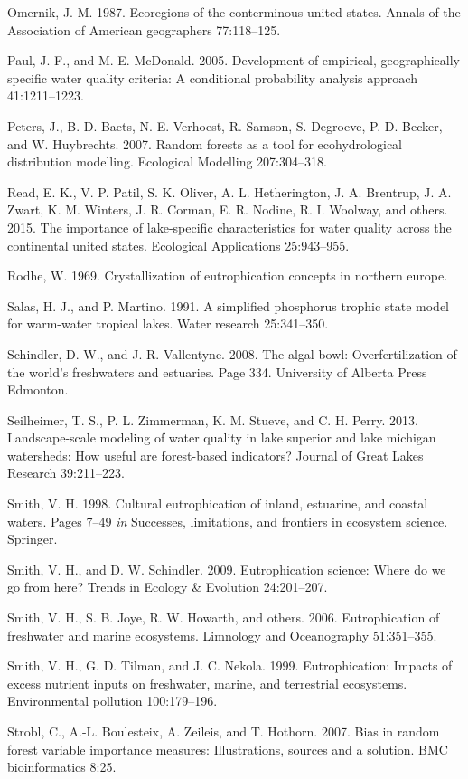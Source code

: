 \documentclass[12pt,]{article}
\begin{document}
Omernik, J. M. 1987. Ecoregions of the conterminous united states.
Annals of the Association of American geographers 77:118--125.

Paul, J. F., and M. E. McDonald. 2005. Development of empirical,
geographically specific water quality criteria: A conditional
probability analysis approach 41:1211--1223.

Peters, J., B. D. Baets, N. E. Verhoest, R. Samson, S. Degroeve, P. D.
Becker, and W. Huybrechts. 2007. Random forests as a tool for
ecohydrological distribution modelling. Ecological Modelling
207:304--318.

Read, E. K., V. P. Patil, S. K. Oliver, A. L. Hetherington, J. A.
Brentrup, J. A. Zwart, K. M. Winters, J. R. Corman, E. R. Nodine, R. I.
Woolway, and others. 2015. The importance of lake-specific
characteristics for water quality across the continental united states.
Ecological Applications 25:943--955.

Rodhe, W. 1969. Crystallization of eutrophication concepts in northern
europe.

Salas, H. J., and P. Martino. 1991. A simplified phosphorus trophic
state model for warm-water tropical lakes. Water research 25:341--350.

Schindler, D. W., and J. R. Vallentyne. 2008. The algal bowl:
Overfertilization of the world's freshwaters and estuaries. Page 334.
University of Alberta Press Edmonton.

Seilheimer, T. S., P. L. Zimmerman, K. M. Stueve, and C. H. Perry. 2013.
Landscape-scale modeling of water quality in lake superior and lake
michigan watersheds: How useful are forest-based indicators? Journal of
Great Lakes Research 39:211--223.

Smith, V. H. 1998. Cultural eutrophication of inland, estuarine, and
coastal waters. Pages 7--49 \emph{in} Successes, limitations, and
frontiers in ecosystem science. Springer.

Smith, V. H., and D. W. Schindler. 2009. Eutrophication science: Where
do we go from here? Trends in Ecology \& Evolution 24:201--207.

Smith, V. H., S. B. Joye, R. W. Howarth, and others. 2006.
Eutrophication of freshwater and marine ecosystems. Limnology and
Oceanography 51:351--355.

Smith, V. H., G. D. Tilman, and J. C. Nekola. 1999. Eutrophication:
Impacts of excess nutrient inputs on freshwater, marine, and terrestrial
ecosystems. Environmental pollution 100:179--196.

Strobl, C., A.-L. Boulesteix, A. Zeileis, and T. Hothorn. 2007. Bias in
random forest variable importance measures: Illustrations, sources and a
solution. BMC bioinformatics 8:25.
\end{document}
